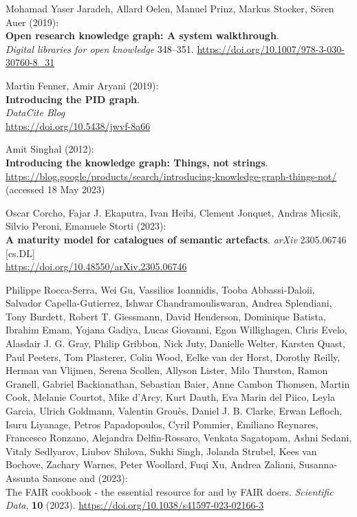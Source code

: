 \begin{thebibliography}{9}
{
Mohamad Yaser Jaradeh, Allard Oelen, Manuel Prinz, Markus Stocker, Sören Auer (2019): \\
\textbf{Open research knowledge graph: A system walkthrough}. \\
\emph{Digital libraries for open knowledge} 348--351.
\url{https://doi.org/10.1007/978-3-030-30760-8_31}

Martin Fenner, Amir Aryani (2019): \\
\textbf{Introducing the PID graph}. \\
\emph{DataCite Blog}\\
\url{https://doi.org/10.5438/jwvf-8a66}

Amit Singhal (2012): \\
\textbf{Introducing the knowledge graph: Things, not strings}.
\url{https://blog.google/products/search/introducing-knowledge-graph-things-not/}
(accessed 18 May 2023)

Oscar Corcho, Fajar J. Ekaputra, Ivan Heibi, Clement Jonquet, Andras
Micsik, Silvio Peroni, Emanuele Storti (2023): \\
\textbf{A maturity model for catalogues of semantic artefacts}. 
\emph{arXiv} 2305.06746 [cs.DL] \\
\url{https://doi.org/10.48550/arXiv.2305.06746}

Philippe Rocca-Serra, Wei Gu, Vassilios Ioannidis, Tooba Abbassi-Daloii,
Salvador Capella-Gutierrez, Ishwar Chandramouliswaran, Andrea
Splendiani, Tony Burdett, Robert T. Giessmann, David Henderson,
Dominique Batista, Ibrahim Emam, Yojana Gadiya, Lucas Giovanni, Egon
Willighagen, Chris Evelo, Alasdair J. G. Gray, Philip Gribbon, Nick
Juty, Danielle Welter, Karsten Quast, Paul Peeters, Tom Plasterer, Colin
Wood, Eelke van der Horst, Dorothy Reilly, Herman van Vlijmen, Serena
Scollen, Allyson Lister, Milo Thurston, Ramon Granell, Gabriel
Backianathan, Sebastian Baier, Anne Cambon Thomsen, Martin Cook, Melanie
Courtot, Mike d'Arcy, Kurt Dauth, Eva Marin del Piico, Leyla Garcia,
Ulrich Goldmann, Valentin Grouès, Daniel J. B. Clarke, Erwan Lefloch,
Isuru Liyanage, Petros Papadopoulos, Cyril Pommier, Emiliano Reynares,
Francesco Ronzano, Alejandra Delfin-Rossaro, Venkata Sagatopam, Ashni
Sedani, Vitaly Sedlyarov, Liubov Shilova, Sukhi Singh, Jolanda Strubel,
Kees van Bochove, Zachary Warnes, Peter Woollard, Fuqi Xu, Andrea
Zaliani, Susanna-Assunta Sansone and (2023): \\
The {FAIR} cookbook -
the essential resource for and by {FAIR} doers. \emph{Scientific Data},
\textbf{10} (2023).
\url{https://doi.org/10.1038/s41597-023-02166-3}

}
\end{thebibliography}
